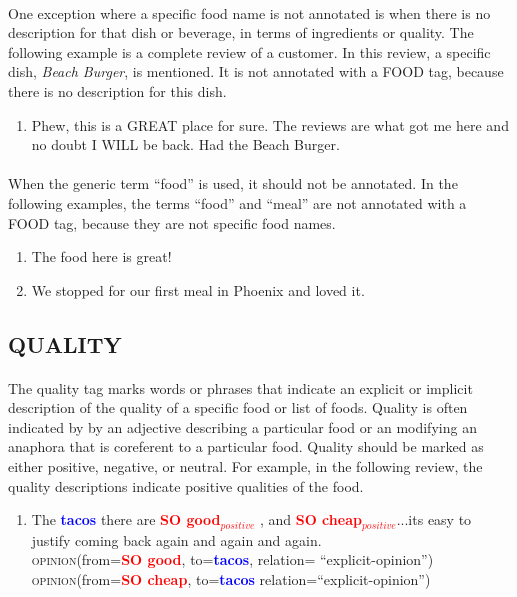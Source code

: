 \documentclass{article}
\begin{document}
\paragraph{}
One exception where a specific food name is not annotated is when there is no description for that dish or beverage, in terms of ingredients or quality. The following example is a complete review of a customer. In this review, a specific dish, \textit{Beach Burger}, is mentioned. It is not annotated with a FOOD tag, because there is no description for this dish.

\begin{enumerate}[resume]
\item Phew, this is a GREAT place for sure. The reviews are what got me here and no doubt I WILL be back. Had the Beach Burger.
\end{enumerate}

\paragraph{}
When the generic term ``food'' is used, it should not be annotated. In the following examples, the terms ``food'' and ``meal'' are not annotated with a FOOD tag, because they are not specific food names. 
\begin{enumerate}[resume]
\item The food here is great!
\item We stopped for our first meal in Phoenix and loved it.
\end{enumerate}


\subsection{QUALITY}
\paragraph{}
The quality tag marks words or phrases that indicate an explicit or implicit description of the quality of a specific food or list of foods. Quality is often indicated by by an adjective describing a particular food or an modifying an anaphora that is coreferent to a particular food. Quality should be marked as either positive, negative, or neutral. For example, in the following review, the quality descriptions indicate positive qualities of the food.

\begin{enumerate}[resume]
\item The \textbf{\textcolor{blue}{tacos}} there are \textbf{\textcolor{red}{SO good$_{positive}$}} , and \textbf{\textcolor{red}{SO cheap$_{positive}$}}...its easy to justify coming back again and again and again.\\
\textsc{opinion}(from=\textbf{\textcolor{red}{SO good}}, to=\textbf{\textcolor{blue}{tacos}}, relation= ``explicit-opinion'')\\
\textsc{opinion}(from=\textbf{\textcolor{red}{SO cheap}}, to=\textbf{\textcolor{blue}{tacos}} relation=``explicit-opinion'')
\end{enumerate}
\end{document}
